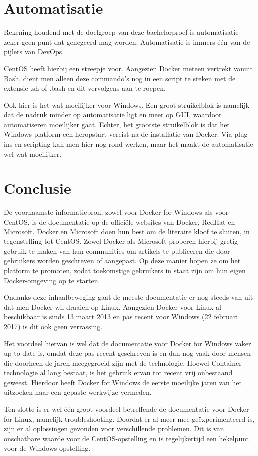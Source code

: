 \section{Automatisatie}
Rekening houdend met de doelgroep van deze bachelorproef is automatisatie zeker geen punt dat genegeerd mag worden. Automatisatie is immers één van de pijlers van DevOps.

CentOS heeft hierbij een streepje voor. Aangezien Docker meteen vertrekt vanuit Bash, dient men alleen deze commando's nog in een script te steken met de extensie .sh of .bash en dit vervolgens aan te roepen. \autocite{Mays2015}

Ook hier is het wat moeilijker voor Windows. Een groot struikelblok is namelijk dat de nadruk minder op automatisatie ligt en meer op GUI, waardoor automatiseren moeilijker gaat. Echter, het grootste struikelblok is dat het Windows-platform een heropstart vereist na de installatie van Docker. Via plug-ins en scripting kan men hier nog rond werken, maar het maakt de automatisatie wel wat moeilijker. \autocite{Rickard2018}

\section{Conclusie}
De voornaamste informatiebron, zowel voor Docker for Windows als voor CentOS, is de documentatie op de officiële websites van Docker, RedHat en Microsoft. Docker en Microsoft doen hun best om de literaire kloof te sluiten, in tegenstelling tot CentOS. Zowel Docker als Microsoft proberen hierbij gretig gebruik te maken van hun communities om artikels te publiceren die door gebruikers worden geschreven of aangepast. Op deze manier hopen ze om het platform te promoten, zodat toekomstige gebruikers in staat zijn om hun eigen Docker-omgeving op te starten.

Ondanks deze inhaalbeweging gaat de meeste documentatie er nog steeds van uit dat men Docker wil draaien op Linux. Aangezien Docker voor Linux al beschikbaar is sinds 13 maart 2013 en pas recent voor Windows (22 februari 2017) is dit ook geen verrassing.

Het voordeel hiervan is wel dat de documentatie voor Docker for Windows vaker up-to-date is, omdat deze pas recent geschreven is en dan nog vaak door mensen die doorheen de jaren meegegroeid zijn met de technologie. Hoewel Container-technologie al lang bestaat, is het gebruik ervan tot recent vrij onbestaand geweest. Hierdoor heeft Docker for Windows de eerste moeilijke jaren van het uitzoeken naar een gepaste werkwijze vermeden. 

Ten slotte is er wel één groot voordeel betreffende de documentatie voor Docker for Linux, namelijk troubleshooting. Doordat er al meer mee geëxperimenteerd is, zijn er al oplossingen gevonden voor verschillende problemen. Dit is van onschatbare waarde voor de CentOS-opstelling en is tegelijkertijd een hekelpunt voor de Windows-opstelling.